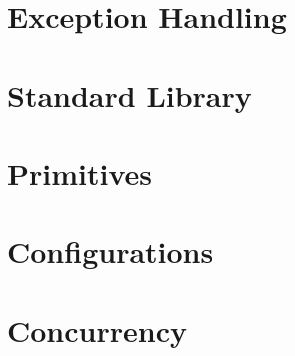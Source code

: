 \documentclass{book}
\begin{document}
\chapter{Exception Handling}

\chapter{Standard Library}

\chapter{Primitives}

\chapter{Configurations}

\chapter{Concurrency}



\end{document}
